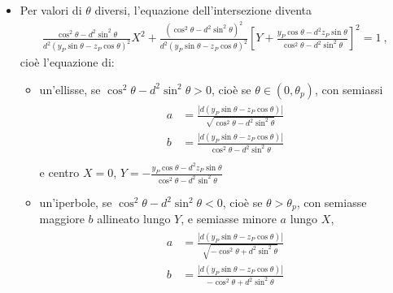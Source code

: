 \documentclass[letterpaper,10pt,italian]{jupyterBook}
\begin{document}
\begin{itemize}
\item {} 
\sphinxAtStartPar
Per valori di \(\theta\) diversi, l’equazione dell’intersezione diventa
\begin{equation*}
\begin{split} 
   \frac{\cos^2 \theta - d^2 \sin^2 \theta }{d^2 ( y_P \sin \theta - z_P \cos \theta )^2 } X^2 + \frac{( \cos^2 \theta - d^2 \sin^2 \theta )^2}{d^2 ( y_P \sin \theta - z_P \cos \theta )^2} \left[ Y + \frac{ y_P \cos \theta - d^2 z_P \sin \theta}{ \cos^2 \theta - d^2 \sin^2 \theta } \right]^2 = 1  \ ,
  \end{split}
\end{equation*}
\sphinxAtStartPar
cioè l’equazione di:
\begin{itemize}
\item {} 
\sphinxAtStartPar
un’ellisse, se \(\cos^2 \theta - d^2 \sin^2\theta > 0\), cioè se \(\theta \in (0, \theta_p)\), con semi\sphinxhyphen{}assi
\begin{equation*}
\begin{split}\begin{aligned}
      a & = \frac{| d ( y_P \sin \theta - z_P \cos \theta )| }{\sqrt{\cos^2 \theta - d^2 \sin^2 \theta} } \\
      b & = \frac{| d ( y_P \sin \theta - z_P \cos \theta )| }{\cos^2 \theta - d^2 \sin^2 \theta} \\
    \end{aligned}\end{split}
\end{equation*}
\sphinxAtStartPar
e centro \(X = 0\), \(Y = - \frac{ y_P \cos \theta - d^2 z_P \sin \theta}{ \cos^2 \theta - d^2 \sin^2 \theta }\)

\item {} 
\sphinxAtStartPar
un’iperbole, se \(\cos^2 \theta - d^2 \sin^2 \theta <0\), cioè se \(\theta > \theta_p\), con semi\sphinxhyphen{}asse maggiore \(b\) allineato lungo \(Y\), e semi\sphinxhyphen{}asse minore \(a\) lungo \(X\),
\begin{equation*}
\begin{split}\begin{aligned}
        a & = \frac{| d ( y_P \sin \theta - z_P \cos \theta )| }{\sqrt{ - \cos^2 \theta + d^2 \sin^2 \theta} } \\
        b & = \frac{| d ( y_P \sin \theta - z_P \cos \theta )| }{- \cos^2 \theta + d^2 \sin^2 \theta} \\
     \end{aligned}\end{split}
\end{equation*}
\end{itemize}

\end{itemize}
\end{document}
